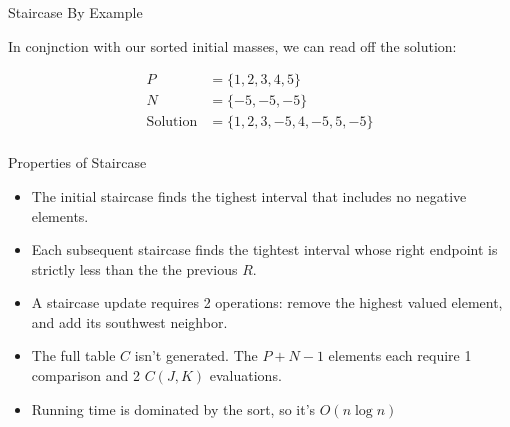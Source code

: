 \documentclass[compress,table]{beamer}
\begin{document}
\begin{frame}[t]{Staircase By Example}
{In conjnction with our sorted initial masses, we can read off the solution: 

\begin{align*}
P &= \{1,2,3,4,5\} \\
N &= \{-5,-5,-5\} \\
\textrm{Solution} &= \{1,2,3,-5,4,-5,5,-5\} \\
\end{align*}

}

\end{frame}

\begin{frame}[t]{Properties of Staircase}

\begin{itemize}
\item The initial staircase finds the tighest interval that includes no negative elements.  

\item Each subsequent staircase finds the tightest interval whose right endpoint is strictly less than the the previous $R$.

\item A staircase update requires 2 operations: remove the highest valued element, and add its southwest neighbor.  

\item The full table $C$ isn't generated. The $P+N-1$ elements each require 1 comparison and 2 $C(J,K)$ evaluations.

\item Running time is dominated by the sort, so it's $O(n \log n)$
\end{itemize}

\end{frame}
\end{document}
